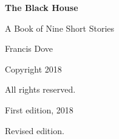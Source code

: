\documentclass[11pt,openright]{book}
\begin{document}
\frontmatter
\thispagestyle{empty}
\vspace*{\fill}
\begin{center}
{\Huge \textbf{The Black House}\par}
\vspace{1em}
{\Large A Book of Nine Short Stories\par}
\vspace{2em}
{\Large Francis Dove\par}
\end{center}
\vspace*{\fill}
\clearpage

\thispagestyle{empty}
\vspace*{\fill}
\begin{center}
Copyright \textcopyright{} 2018

All rights reserved.

\vspace{1em}
First edition, 2018

\vspace{1em}
Revised edition.
\end{center}
\vspace*{\fill}
\clearpage

\tableofcontents
\clearpage

\mainmatter

\end{document}
